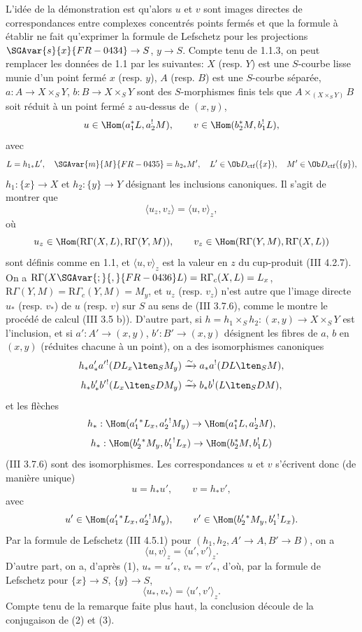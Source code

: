 L'idée de la démonstration est qu'alors $u$ et $v$ sont images directes de correspondances entre complexes concentrés  points fermés et que la formule à établir ne fait qu'exprimer la formule de Lefschetz pour les projections $\SGAvar{s}{x}{FR-0434}\to S$, $y\to S$. Compte tenu de 1.1.3, on peut remplacer les données de 1.1 par les suivantes: $X$ (resp. $Y$) est une $S$-courbe lisse munie d'un point fermé $x$ (resp. $y$), $A$ (resp. $B$) est une $S$-courbe séparée, $a:A\to X\times_S Y$, $b:B\to X\times_S Y$ sont des $S$-morphismes finis tels que $A\times_{(X\times_SY)}B$ soit réduit à un point fermé $z$ au-dessus de $(x,y)$,
\[
u\in\Hom(a_1^*L,a_2^!M),\qquad v\in\Hom(b_2^*M,b_1^!L),
\]
avec
\[
L=h_{1*}L',\quad \SGAvar{m}{M}{FR-0435}=h_{2*}M',\quad
L'\in\Ob D_{\mathrm{ctf}}(\{x\}),\quad M'\in\Ob D_{\mathrm{ctf}}(\{y\}),
\]
$h_1:\{x\}\to X$ et $h_2:\{y\}\to Y$
désignant les inclusions canoniques. Il s'agit de montrer que
\[
\langle u_z,v_z\rangle=\langle u,v\rangle_z,
\]
où
\[
u_z\in\Hom(\mathrm{R}\Gamma(X,L),\mathrm{R}\Gamma(Y,M)),\qquad
v_z\in\Hom(\mathrm{R}\Gamma(Y,M),\mathrm{R}\Gamma(X,L))
\]
sont définis comme en 1.1, et $\langle u,v\rangle_z$ est la valeur en $z$ du cup-produit (III 4.2.7). On a $\mathrm{R}\Gamma(X\SGAvar{;}{,}{FR-0436}L)=\mathrm{R}\Gamma_c(X,L)=L_x$, $\mathrm{R}\Gamma(Y,M)=\mathrm{R}\Gamma_c(Y,M)=M_y$, et $u_z$ (resp. $v_z$) n'est autre que l'image directe $u_*$ (resp. $v_*$) de $u$ (resp. $v$) sur $S$ au sens de (III 3.7.6), comme le montre le procédé de calcul (III 3.5 b)). D'autre part, si $h=h_1\times_Sh_2:(x,y)\to X\times_SY$ est l'inclusion, et si $a':A'\to(x,y)$, $b':B'\to(x,y)$ désignent les fibres de $a$, $b$ en $(x,y)$ (réduites chacune à un point), on a des isomorphismes canoniques
\[
h_*a'_*a'{}^!(DL_x\lten_SM_y)
 \xrightarrow{\sim} a_*a^!(DL\lten_SM),
\]
\[
h_*b'_*b'{}^!(L_x\lten_SDM_y)
 \xrightarrow{\sim} b_*b^!(L\lten_SDM),
\]
et les flèches
\[
h_*:\Hom(a_1'{}^*L_x,a_2'{}^!M_y)\to \Hom(a_1^*L,a_2^!M),
\]
\[
h_*:\Hom(b_2'{}^*M_y,b_1'{}^!L_x)\to \Hom(b_2^*M,b_1^!L)
\]
(III 3.7.6) sont des isomorphismes. Les correspondances $u$ et $v$ s'écrivent donc (de manière unique)
\begin{equation}\tag{1}
u=h_*u',\qquad v=h_*v',
\end{equation}
avec
\[
u'\in\Hom(a_1'{}^*L_x,a_2'{}^!M_y),\qquad
v'\in\Hom(b_2'{}^*M_y,b_1'{}^!L_x).
\]
Par la formule de Lefschetz (III 4.5.1) pour $(h_1,h_2,A'\to A,B'\to B)$, on a
\begin{equation}\tag{2}
\langle u,v\rangle_z=\langle u',v'\rangle_z .
\end{equation}
D'autre part, on a, d'après (1), $u_*=u'_*$, $v_*=v'_*$, d'où, par la formule de Lefschetz pour $\{x\}\to S$, $\{y\}\to S$,
\begin{equation}\tag{3}
\langle u_*,v_*\rangle=\langle u',v'\rangle_z .
\end{equation}
Compte tenu de la remarque faite plus haut, la conclusion découle de la conjugaison de (2) et (3).


